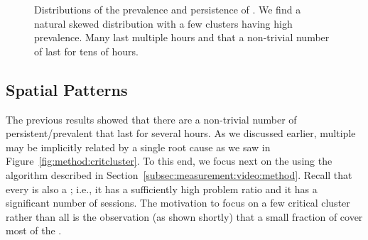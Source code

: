 \begin{figure}[t]
\centering
\hspace{-1.5cm}
\captionsetup[subfigure]{justification=centering,farskip=-1pt,captionskip=5pt}
\hspace{-0.5cm}
 \hspace{-1.5cm}
\caption{Distributions of the prevalence and persistence of  \problemclusters.
We find a natural skewed distribution with a few 
 clusters having high prevalence. 
 Many \problemclusters last multiple hours and that a non-trivial 
 number of \problemclusters last for tens of hours.}
\label{fig:}
\end{figure}

\subsection{Spatial Patterns}
\label{subsec:measurement:video:spatial}

The previous results showed that there are a non-trivial 
number of persistent/prevalent \problemclusters that last for
several hours. 
As we discussed earlier,  multiple \problemclusters may 
be implicitly related by a single root cause as we saw in
Figure~\ref{fig:method:critcluster}.  
To this end, we focus next on the \criticalclusters using the 
algorithm described in 
Section~\ref{subsec:measurement:video:method}. 
Recall that every  \criticalclusters is also a \problemcluster; 
i.e.,  it has a sufficiently high problem ratio and it has a 
significant number of sessions. The motivation to focus on 
a few critical cluster rather than all \problemclusters is the 
observation (as shown shortly) that a small fraction of 
\problemclusters cover most of the \problemsessions.

